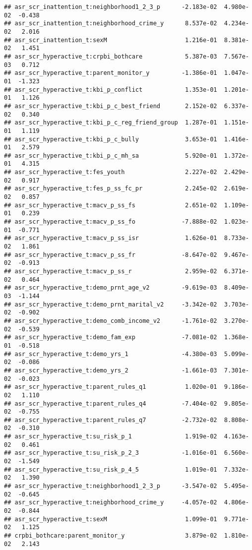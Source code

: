 \documentclass[
]{article}
\begin{document}
\begin{verbatim}
## asr_scr_inattention_t:neighborhood1_2_3_p      -2.183e-02  4.980e-02  -0.438
## asr_scr_inattention_t:neighborhood_crime_y      8.537e-02  4.234e-02   2.016
## asr_scr_inattention_t:sexM                      1.216e-01  8.381e-02   1.451
## asr_scr_hyperactive_t:crpbi_bothcare            5.387e-03  7.567e-03   0.712
## asr_scr_hyperactive_t:parent_monitor_y         -1.386e-01  1.047e-01  -1.323
## asr_scr_hyperactive_t:kbi_p_conflict            1.353e-01  1.201e-01   1.126
## asr_scr_hyperactive_t:kbi_p_c_best_friend       2.152e-02  6.337e-02   0.340
## asr_scr_hyperactive_t:kbi_p_c_reg_friend_group  1.287e-01  1.151e-01   1.119
## asr_scr_hyperactive_t:kbi_p_c_bully             3.653e-01  1.416e-01   2.579
## asr_scr_hyperactive_t:kbi_p_c_mh_sa             5.920e-01  1.372e-01   4.315
## asr_scr_hyperactive_t:fes_youth                 2.227e-02  2.429e-02   0.917
## asr_scr_hyperactive_t:fes_p_ss_fc_pr            2.245e-02  2.619e-02   0.857
## asr_scr_hyperactive_t:macv_p_ss_fs              2.651e-02  1.109e-01   0.239
## asr_scr_hyperactive_t:macv_p_ss_fo             -7.888e-02  1.023e-01  -0.771
## asr_scr_hyperactive_t:macv_p_ss_isr             1.626e-01  8.733e-02   1.861
## asr_scr_hyperactive_t:macv_p_ss_fr             -8.647e-02  9.467e-02  -0.913
## asr_scr_hyperactive_t:macv_p_ss_r               2.959e-02  6.371e-02   0.464
## asr_scr_hyperactive_t:demo_prnt_age_v2         -9.619e-03  8.409e-03  -1.144
## asr_scr_hyperactive_t:demo_prnt_marital_v2     -3.342e-02  3.703e-02  -0.902
## asr_scr_hyperactive_t:demo_comb_income_v2      -1.761e-02  3.270e-02  -0.539
## asr_scr_hyperactive_t:demo_fam_exp             -7.081e-02  1.368e-01  -0.518
## asr_scr_hyperactive_t:demo_yrs_1               -4.380e-03  5.099e-02  -0.086
## asr_scr_hyperactive_t:demo_yrs_2               -1.661e-03  7.301e-02  -0.023
## asr_scr_hyperactive_t:parent_rules_q1           1.020e-01  9.186e-02   1.110
## asr_scr_hyperactive_t:parent_rules_q4          -7.404e-02  9.805e-02  -0.755
## asr_scr_hyperactive_t:parent_rules_q7          -2.732e-02  8.808e-02  -0.310
## asr_scr_hyperactive_t:su_risk_p_1               1.919e-02  4.163e-02   0.461
## asr_scr_hyperactive_t:su_risk_p_2_3            -1.016e-01  6.560e-02  -1.549
## asr_scr_hyperactive_t:su_risk_p_4_5             1.019e-01  7.332e-02   1.390
## asr_scr_hyperactive_t:neighborhood1_2_3_p      -3.547e-02  5.495e-02  -0.645
## asr_scr_hyperactive_t:neighborhood_crime_y     -4.057e-02  4.806e-02  -0.844
## asr_scr_hyperactive_t:sexM                      1.099e-01  9.771e-02   1.125
## crpbi_bothcare:parent_monitor_y                 3.879e-02  1.810e-02   2.143

\end{verbatim}
\end{document}
